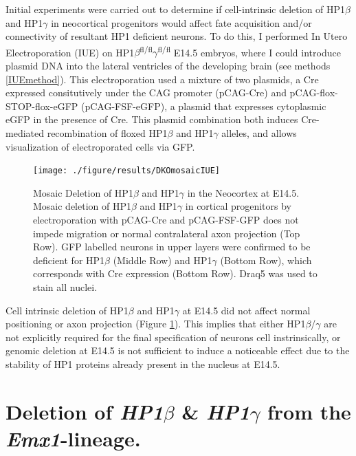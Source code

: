 \documentclass[onehalf,12pt]{beavtex}
\begin{document}
  Initial experiments were carried out to determine if cell-intrinsic
  deletion of HP1\(\beta\) and HP1\(\gamma\) in neocortical progenitors
  would affect fate acquisition and/or connectivity of resultant HP1
  deficient neurons. To do this, I performed In Utero Electroporation
  (IUE) on
  HP1\(\beta\)\textsuperscript{fl/fl}\(\gamma\)\textsuperscript{fl/fl}
  E14.5 embryos, where I could introduce plasmid DNA into the lateral
  ventricles of the developing brain (see methods \ref{IUEmethod}). This
  electroporation used a mixture of two plasmids, a Cre expressed
  consitutively under the CAG promoter (pCAG-Cre) and
  pCAG-flox-STOP-flox-eGFP (pCAG-FSF-eGFP), a plasmid that expresses
  cytoplasmic eGFP in the presence of Cre. This plasmid combination both
  induces Cre-mediated recombination of floxed HP1\(\beta\) and
  HP1\(\gamma\) alleles, and allows visualization of electroporated cells
  via GFP.
  
  \begin{figure}
  
  {\centering \texttt{[image: ./figure/results/DKOmosaicIUE]} 
  
  }
  
  \caption[Mosaic Deletion of HP1$\beta$ and HP1$\gamma$ in the Neocortex at E14.5.]{Mosaic Deletion of HP1$\beta$ and HP1$\gamma$ in the Neocortex at E14.5. Mosaic deletion of HP1$\beta$ and HP1$\gamma$ in cortical progenitors by electroporation with pCAG-Cre and pCAG-FSF-GFP does not impede migration or normal contralateral axon projection (Top Row).  GFP labelled neurons in upper layers were confirmed to be deficient for HP1$\beta$ (Middle Row) and HP1$\gamma$ (Bottom Row), which corresponds with Cre expression (Bottom Row).  Draq5 was used to stain all nuclei.}\label{fig:DKOmosaic}
  \end{figure}
  
  Cell intrinsic deletion of HP1\(\beta\) and HP1\(\gamma\) at E14.5 did
  not affect normal positioning or axon projection (Figure
  \ref{fig:DKOmosaic}). This implies that either HP1\(\beta\)/\(\gamma\)
  are not explicitly required for the final specification of neurons cell
  instrinsically, or genomic deletion at E14.5 is not sufficient to induce
  a noticeable effect due to the stability of HP1 proteins already present
  in the nucleus at E14.5.
  
  \section{\texorpdfstring{Deletion of \emph{HP1\(\beta\)} \&
  \emph{HP1\(\gamma\)} from the
  \emph{Emx1}-lineage.}{Deletion of HP1\textbackslash{}beta \& HP1\textbackslash{}gamma from the Emx1-lineage.}}\label{deletion-of-hp1beta-hp1gamma-from-the-emx1-lineage.}
  
\end{document}

